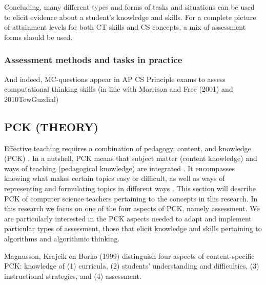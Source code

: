 Concluding, many different types and forms of tasks and situations can be used to elicit evidence about a student's knowledge and skills. For a complete picture of attainment levels for both CT skills and CS concepts, a mix of assessment forms should be used.

\subsubsection{Assessment methods and tasks in practice}


And indeed, MC-questions appear in AP CS Principle exams to assess computational thinking skills (in line with Morrison and Free (2001) and 2010TewGuzdial)


\subsection{PCK (THEORY)}
Effective teaching requires a combination of pedagogy, content, and knowledge (PCK) \cite{shulman1986pedagogical}. In a nutshell, PCK means that subject matter (content knowledge) and ways of teaching (pedagogical knowledge) are integrated \cite{Yadav2016}. It encompasses knowing what makes certain topics easy or difficult, as well as ways of representing and formulating topics in different ways \cite{shulman1986pedagogical}. This section will describe PCK of computer science teachers pertaining to the concepts in this research. In this research we focus on one of the four aspects of PCK, namely assessment. We are particularly interested in the PCK aspects needed to adapt and implement particular types of assessment, those that elicit knowledge and skills pertaining to algorithms and algorithmic thinking.

Magnusson, Krajcik en Borko (1999) distinguish four aspects of content-specific PCK: knowledge of
(1) curricula, (2) students' understanding and difficulties, (3) instructional strategies, and (4) assessment.

